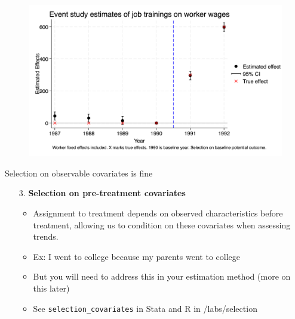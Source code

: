 \documentclass{beamer}
\begin{document}
\begin{frame}
 
\begin{figure}
    \centering
    \includegraphics[width=\textwidth]{./lecture_includes/selection_y0.png}
\end{figure}

\end{frame}




\begin{frame}{Selection on observable covariates is fine}
\begin{enumerate}
    \item[3. ] \textbf{Selection on pre-treatment covariates}
    \begin{itemize}
        \item Assignment to treatment depends on observed characteristics before treatment, allowing us to condition on these covariates when assessing trends.
        \item Ex: I went to college because my parents went to college
        \item But you will need to address this in your estimation method (more on this later)
	\item See \texttt{selection_covariates} in Stata and R in /labs/selection
    \end{itemize}
    
    
\end{enumerate}
\end{frame}
\end{document}
